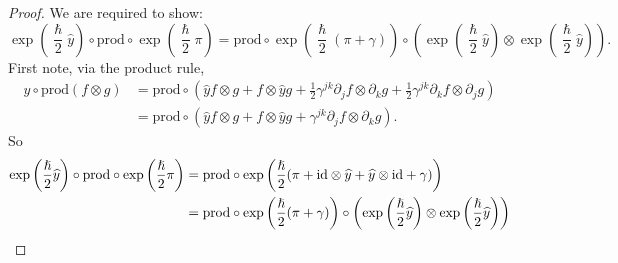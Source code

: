     \begin{proof}
    We are required to show:
    \[ \exp \left( \frac{\hslash}{2} \widehat{y} \right) \circ  \mathrm{prod} \circ \exp  \left( \frac{\hslash}{2}  \pi   \right) = \mathrm{prod} \circ \exp  \left( \frac{\hslash}{2}  (\pi + \gamma ) \right) \circ \left( \exp \left( \frac{\hslash}{2} \widehat{y} \right) \otimes \exp \left( \frac{\hslash}{2} \widehat{y} \right) \right).  \]
    First note, via the product rule, 
    \begin{align*} \widehat{y} \circ \mathrm{prod} ( f \otimes g) &= \mathrm{prod} \circ  ( \widehat{y} f \otimes g + f \otimes \widehat{y} g + \frac{1}{2} \gamma^{jk} \partial_j f \otimes \partial_k g + \frac{1}{2} \gamma^{jk}  \partial_k f \otimes \partial_j g) \\ 
    &= \mathrm{prod} \circ  ( \widehat{y} f \otimes g + f \otimes \widehat{y} g + \gamma^{jk} \partial_j f \otimes \partial_k g ). 
    \end{align*}
    So 
    \begin{align*} \exp \left( \frac{\hslash}{2} \widehat{y} \right) \circ \mathrm{prod} \circ \exp \left( \frac{\hslash}{2} \pi  \right)  &= \mathrm{prod} \circ  \exp \left( \frac{\hslash}{2} ( \pi +  \mathrm{id} \otimes \widehat{y} + \widehat{y} \otimes \mathrm{id} +  \gamma ) \right) \\
    &= \mathrm{prod} \circ \exp  \left( \frac{\hslash}{2}  (\pi + \gamma ) \right) \circ \left( \exp \left( \frac{\hslash}{2} \widehat{y} \right) \otimes \exp \left( \frac{\hslash}{2} \widehat{y} \right) \right) 
    \end{align*}
    \end{proof}
    
    
